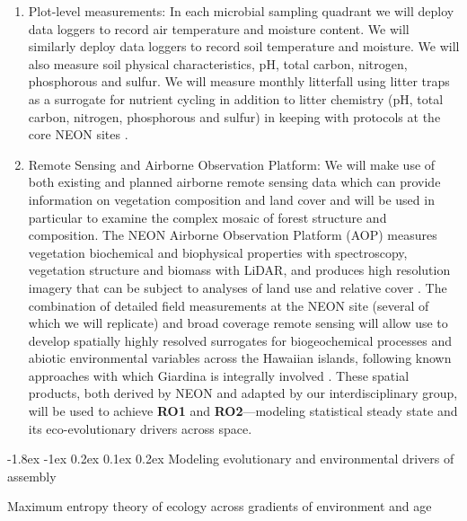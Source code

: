 \documentclass[11pt]{article}
\makeatletter
\renewcommand\subsubsection{\@startsection{subsection}{1}{\z@}%
                                  {-1.8ex \@plus -1ex \@minus 0.2ex}%
                                  {0.1ex \@plus 0.2ex}%
                                  {\normalfont\bfseries}}
\renewcommand{\paragraph}{\@startsection{paragraph}{4}{\z@}
  {1ex \@plus 1ex \@minus .2ex}{-1em}
  {\normalfont\normalsize\it}
}
\makeatother
\begin{document}
\begin{enumerate}
\item Plot-level measurements: In each microbial sampling quadrant we
  will deploy data loggers to record air temperature and moisture
  content.  We will similarly deploy data loggers to record soil
  temperature and moisture.  We will also measure soil physical
  characteristics, pH, total carbon, nitrogen, phosphorous and sulfur.
  We will measure monthly litterfall using litter traps as a surrogate
  for nutrient cycling \citep{austin2000, giardina2004} in addition to
  litter chemistry (pH, total carbon, nitrogen, phosphorous and
  sulfur) in keeping with protocols at the core NEON sites \citep{NEON}.
\item Remote Sensing and Airborne Observation Platform: We will make
  use of both existing \citep[e.g.,][]{asner2006, asner2016} and
  planned airborne remote sensing data which can provide information
  on vegetation composition and land cover and will be used in
  particular to examine the complex mosaic of forest structure and
  composition. The NEON Airborne Observation Platform (AOP) measures
  vegetation biochemical and biophysical properties with spectroscopy,
  vegetation structure and biomass with LiDAR, and produces high
  resolution imagery that can be subject to analyses of land use and
  relative cover \citep{NEON}. The combination of detailed field
  measurements at the NEON site (several of which we will replicate)
  and broad coverage remote sensing will allow use to develop
  spatially highly resolved surrogates for biogeochemical processes
  and abiotic environmental variables across the Hawaiian islands,
  following known approaches with which Giardina is integrally
  involved \citep[e.g.,][]{broadbent2014, asner2016}.  These spatial
  products, both derived by NEON and adapted by our interdisciplinary
  group, will be used to achieve {\bf RO1} and {\bf RO2}---modeling statistical
  steady state and its eco-evolutionary drivers across space.
\end{enumerate}



\subsubsection{Modeling evolutionary and environmental drivers of
  assembly}


\paragraph{Maximum entropy theory of ecology across gradients of
  environment and age}
\end{document}
